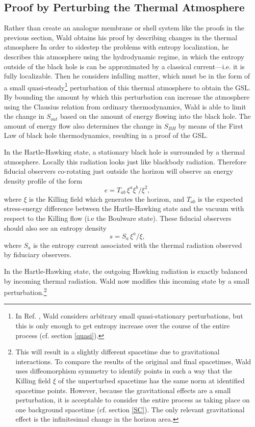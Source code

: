 \documentclass{article}
\begin{document}
\subsection{Proof by Perturbing the Thermal Atmosphere}\label{atm}

Rather than create an analogue membrane or shell system like the proofs in the previous section, Wald \cite{wald94} obtains his proof by describing changes in the thermal atmosphere  In order to sidestep the problems with entropy localization, he describes this atmosphere using the hydrodynamic regime, in which the entropy outside of the black hole is can be approximated by a classical current---i.e. it is fully localizable.  Then he considers infalling matter, which must be in the form of a small quasi-steady\footnote{In Ref. \cite{wald94}, Wald considers arbitrary small quasi-stationary perturbations, but this is only enough to get entropy increase over the course of the entire process (cf. section \ref{quasi}).} perturbation of this thermal atmosphere to obtain the GSL.  By bounding the amount by which this perturbation can increase the atmosphere using the Clausius relation from ordinary thermodynamics, Wald is able to limit the change in $S_{out}$ based on the amount of energy flowing into the black hole.  The amount of energy flow also determines the change in $S_{BH}$ by means of the First Law of black hole thermodynamics, resulting in a proof of the GSL.

In the Hartle-Hawking state, a stationary black hole is surrounded by a thermal atmosphere.  Locally this radiation looks just like blackbody radiation.  Therefore fiducial observers co-rotating just outside the horizon will observe an energy density profile of the form
\begin{equation}
e = T_{ab}\,\xi^a \xi^b / \xi^2,
\end{equation}
where $\xi$ is the Killing field which generates the horizon, and $T_{ab}$ is the expected stress-energy difference between the Hartle-Hawking state and the vacuum with respect to the Killing flow (i.e the Boulware state).  These fiducial observers should also see an entropy density
\begin{equation}
s = S_a\,\xi^a / \xi,
\end{equation}
where $S_a$ is the entropy current associated with the thermal radiation observed by fiduciary observers.

In the Hartle-Hawking state, the outgoing Hawking radiation is exactly balanced by incoming thermal radiation.  Wald now modifies this incoming state by a small perturbation.\footnote{This will result in a slightly different spacetime due to gravitational interactions.  To compare the results of the original and final spacetimes, Wald uses diffeomorphism symmetry to identify points in such a way that the Killing field $\xi$ of the unperturbed spacetime has the same norm at identified spacetime points.  However, because the gravitational effects are a small perturbation, it is acceptable to consider the entire process as taking place on one background spacetime (cf. section \ref{SC}).  The only relevant gravitational effect is the infinitesimal change in the horizon area.}
\end{document}
